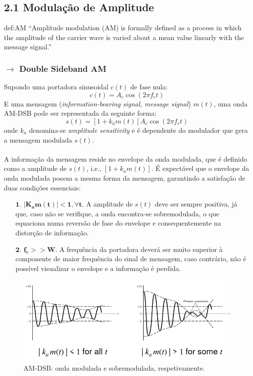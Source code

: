 \subsection{2.1 Modulação de Amplitude}
\label{subsec:AM}

\begin{theo}{def:AM}\label{def:AM}
     ``Amplitude modulation (AM) is formally defined as a process in which the amplitude of the carrier wave is varied about a mean value linearly with the message signal.''
\end{theo}

\subsubsection[2.1.1 Double Sideband AM]{$\rightarrow$ Double Sideband AM}
\label{subsubsec:conditions}
Supondo uma portadora sinusoidal $c(t)$ de fase nula:
$$
    c(t) = A_c\cos{(2\pi f_c t)}
$$
\noindent E uma mensagem (\textit{information-bearing signal, message signal}) $m(t)$, uma onda AM-DSB pode ser representada da seguinte forma:
$$
    \boxed{s(t) = \left[1 + k_am(t)\right]A_c\cos{(2\pi f_c t)}}
$$
\noindent onde $k_a$ denomina-se \textit{amplitude sensitivity} e é dependente do modulador que gera a mensagem modulada $s(t)$.
\\\\
A informação da mensagem reside no envelope da onda modulada, que é definido como a amplitude de $s(t)$, i.e., $[1 + k_a m(t)]$. É expectável que o envelope da onda modulada possua a mesma forma da mensagem, garantindo a satisfação de duas condições essenciais:

\begin{enumerate}
    \item[$\pmb{1.}$] $\mathbf{|K_a m(t)|<1, \forall t}$. A amplitude de $s(t)$ deve ser sempre positiva, já que, caso não se verifique, a onda encontra-se sobremodulada, o que equaciona numa reversão de fase do envelope e consequentemente na distorção de informação.
    
    \item[$\pmb{2.}$] $\mathbf{f_c >> W}$. A frequência da portadora deverá ser muito superior à componente de maior frequência do sinal de mensagem, caso contrário, não é possível visualizar o envelope e a informação é perdida.
\end{enumerate}

\begin{figure}[H]
    \centering
    \includegraphics[width = 0.9\linewidth]{img/analog/AM/DSB.png}
    \caption{AM-DSB: onda modulada e sobremodulada, respetivamente.}
    \label{fig:DSB}
\end{figure}

